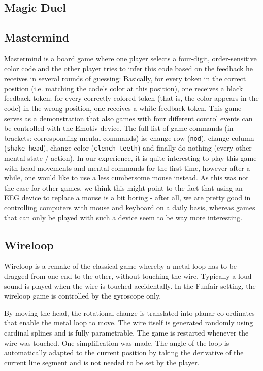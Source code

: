 \documentclass{utue} %
\begin{document}
\subsection{Magic Duel}
\subsection{Mastermind}
Mastermind is a board game where one player selects a four-digit, order-sensitive color code and the other player tries to infer this code based on the feedback he receives in several rounds of guessing: Basically, for every token in the correct position (i.e. matching the code's color at this position), one receives a black feedback token; for every correctly colored token (that is, the color appears in the code) in the wrong position, one receives a white feedback token. This game serves as a demonstration that also games with four different control events can be controlled with the Emotiv device. The full list of game commands (in brackets: corresponding mental commands) is: change row (\texttt{nod}), change column (\texttt{shake head}), change color (\texttt{clench teeth}) and finally do nothing (every other mental state / action). In our experience, it is quite interesting to play this game with head movements and mental commands for the first time, however after a while, one would like to use a less cumbersome mouse instead. As this was not the case for other games, we think this might point to the fact that using an EEG device to replace a mouse is a bit boring - after all, we are pretty good in controlling computers with mouse and keyboard on a daily basis, whereas games that can only be played with such a device seem to be way more interesting.


\subsection{Wireloop}
Wireloop is a remake of the classical game whereby a metal loop has to be dragged from one end to the other, without touching the wire. Typically a loud sound is played when the wire is touched accidentally. In the Funfair setting, the wireloop game is controlled by the gyroscope only.

By moving the head, the rotational change is translated into planar co-ordinates that enable the metal loop to move. The wire itself is generated randomly using cardinal splines and is fully parametrable. The game is restarted whenever the wire was touched. One simplification was made. The angle of the loop is automatically adapted to the current position by taking the derivative of the current line segment and is not needed to be set by the player.
\end{document}
